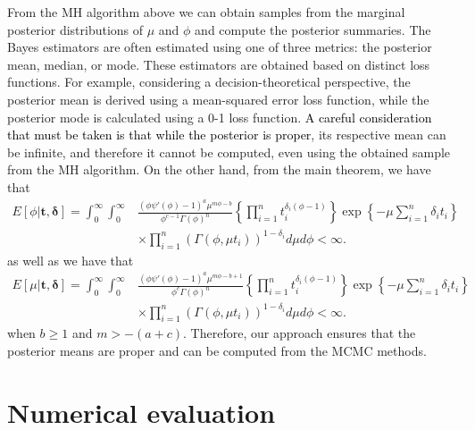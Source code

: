 \documentclass[]{interact}
\theoremstyle{plain}%
\theoremstyle{definition}
\theoremstyle{remark}
\begin{document}
From the MH algorithm above we can obtain samples from the marginal posterior distributions of $\mu$ and $\phi$ and compute the posterior summaries. The Bayes estimators are often estimated using one of three metrics: the posterior mean, median, or mode. These estimators are obtained based on distinct loss functions. For example, considering a decision-theoretical perspective, the posterior mean is derived using a mean-squared error loss function, while the posterior mode is calculated using a 0-1 loss function. \textcolor{black}{A careful consideration that must be taken is that while the posterior is proper}, its respective mean can be infinite, and therefore it cannot be computed, even using the obtained sample from the MH algorithm. On the other hand, from the main theorem, we have that
\begin{equation*}
\begin{aligned}
E[\phi|\boldsymbol{t,\delta}]=\int_0^{\infty}\int_0^{\infty}&\frac{(\phi\psi'(\phi)-1)^{a}\mu^{m\phi-b}}{\phi^{c-1}\Gamma(\phi)^n}\left\{\prod_{i=1}^n{t_i^{\delta_i(\phi-1)}}\right\}\exp\left\{-\mu\sum_{i=1}^n {\delta_i}t_i\right\}\\&\times\prod_{i=1}^n\left(\Gamma(\phi,\mu t_i)\right)^{1-\delta_i} d\mu d\phi<\infty.
\end{aligned}
\end{equation*}
as well as we have that
\begin{equation*}
\begin{aligned}
E[\mu|\boldsymbol{t,\delta}]=\int_0^{\infty}\int_0^{\infty}&\frac{(\phi\psi'(\phi)-1)^{a}\mu^{m\phi-b+1}}{\phi^{c}\Gamma(\phi)^n}\left\{\prod_{i=1}^n{t_i^{\delta_i(\phi-1)}}\right\}\exp\left\{-\mu\sum_{i=1}^n {\delta_i}t_i\right\}\\&\times\prod_{i=1}^n\left(\Gamma(\phi,\mu t_i)\right)^{1-\delta_i} d\mu d\phi<\infty.
\end{aligned}
\end{equation*}
when $b\geq 1$ and $m>-(a+c)$. Therefore, our approach ensures that the posterior means are proper and can be computed from the MCMC methods.



\section{Numerical evaluation}\label{sec:4}
\end{document}

